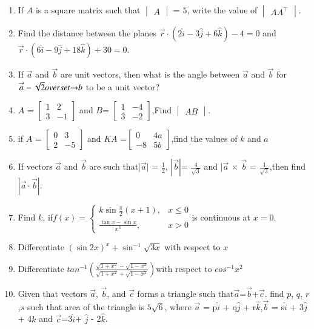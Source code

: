 \documentclass[12pt,-letter paper]{article}
\providecommand{\mydet}[1]{\ensuremath{\begin{vmatrix}#1\end{vmatrix}}}
\providecommand{\myvec}[1]{\ensuremath{\begin{bmatrix}#1\end{bmatrix}}}
\providecommand{\brak}[1]{\ensuremath{\left(#1\right)}}
\begin{document}
\begin{enumerate}
	\item  If $A$ is a square matrix such that $\mydet{A}$ = $5$, write the value of $\mydet{AA^\top}$.
    \item 
	    Find the distance between the planes $\overset{\rightarrow}{r} \cdot \brak{2\hat{i} - 3\hat{j} + 6\hat{k}} - 4 = 0$ and $\overset{\rightarrow}{r} \cdot \brak{6\hat{i} - 9\hat{j} + 18\hat{k}} + 30 = 0$.

\item 
	If $\overset{\rightarrow}{a}$ and $\overset{\rightarrow}{b}$ are unit vectors, then what is the angle between $\overset{\rightarrow}{a}$ and $\overset{\rightarrow}{b}$ for $\overset{\rightarrow}{a} - \sqrt{2} \, \\overset{\rightarrow}{b}$ to be a unit vector?

\item $ A $ = $\myvec{1 & 2 \\ 3 & -1}$ and $B$= $\myvec{1 & -4 \\ 3 & -2}$,Find  $\mydet{AB}$.

\item 
	if $A$ = $\myvec{0 & 3 \\ 2 & -5 }$ and $KA$ =$\myvec{ 0 & 4a \\ -8 & 5b}$,find the values of $ k $ and $ a $

\item 
	If vectors $\overset{\rightarrow}{a}$ and $\overset{\rightarrow}{b}$ are such that|$\overset{\rightarrow}{a}|$ = $\frac{1}{2}$, $|\overset{\rightarrow}{b}| $= $\frac{4}{\sqrt{3}}$ and $|\overset{\rightarrow}{a}$ $\times$ $\overset{\rightarrow}{b}$ = $\frac{1}{\sqrt{3}}$,then find $|\overset{\rightarrow}{a} \cdot \overset{\rightarrow}{b}|$.
\item
	Find $ k $, if$ f(x) =\begin{cases} k \sin \frac{\pi}{2}(x+1), & x \leq 0 \\ \frac{\tan x - \sin x}{x^3}, & x > 0  \end{cases}$is continuous at $ x = 0 $.

\item

	Differentiate $\brak{\sin{2x}}^x + \sin^{-1}\sqrt{3x}$ with respect to $x$ 
\item 
	Differentiate $tan^{-1}{\brak{\frac{\sqrt{1+x^2}-\sqrt{1-x^2}}{\sqrt{1+x^2}+\sqrt{1-x^2}}}}$with respect to $cos^{-1}{x^2}$

\item
	Given that vectors $\overset{\rightarrow}{a}$, $\overset{\rightarrow}{b}$, and $\overset{\rightarrow}{c}$ forms a triangle such that$\overset{\rightarrow}{a}$=$\overset{\rightarrow}{b}$+$\overset{\rightarrow}{c}$. find $p$, $q$, $r$,$s$ such that area of the triangle is $5\sqrt{6}$, where $\overset{\rightarrow}{a}$ = p$\hat{i}$ + q$\hat{j}$ + r$\hat{k}$,$\overset{\rightarrow}{b}$ = s$\hat{i}$ + 3$\hat{j}$ + 4$\hat{k}$ and $\overset{\rightarrow}{c}$=3$\hat{i}$+ $\hat{j}$ - 2$\hat{k}$.


\end{enumerate}
\end{document}
